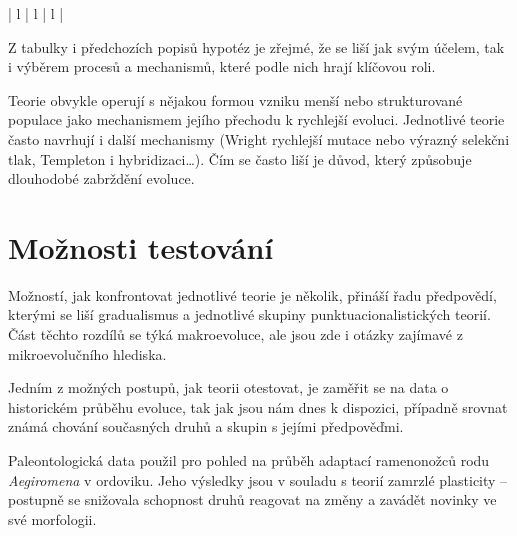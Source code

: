 \begin{longtable}{| l | l | l |}
 \\

\hline
\end{longtable}
\normalsize

Z tabulky i předchozích popisů hypotéz je zřejmé, že se liší jak svým účelem, tak i výběrem procesů a mechanismů,
které podle nich hrají klíčovou roli.

Teorie obvykle operují s nějakou formou vzniku menší nebo strukturované populace jako mechanismem jejího přechodu
k rychlejší evoluci. Jednotlivé teorie často navrhují i další mechanismy (Wright rychlejší mutace nebo výrazný
selekčni tlak, Templeton i hybridizaci\ldots). Čím se často liší je důvod, který způsobuje dlouhodobé zabrždění evoluce.




\section{Možnosti testování}

Možností, jak konfrontovat jednotlivé teorie je několik, \citet[str. 4-5]{flegr2013} přináší řadu
předpovědí, kterými se liší gradualismus a jednotlivé skupiny punktuacionalistických teorií. Část těchto rozdílů se
týká makroevoluce, ale jsou zde i otázky zajímavé z mikroevolučního hlediska.

Jedním z možných postupů, jak teorii otestovat, je zaměřit se na data o historickém průběhu evoluce, tak jak jsou nám
dnes k dispozici, případně srovnat známá chování současných druhů a skupin s jejími předpověďmi.

Paleontologická data použil \citet{mikulavs2008} pro pohled na průběh adaptací ramenonožců rodu \textit{Aegiromena} v
ordoviku. Jeho výsledky jsou v souladu s teorií zamrzlé plasticity -- postupně se snižovala schopnost druhů reagovat
na změny a zavádět novinky ve své morfologii.

